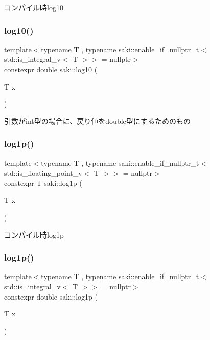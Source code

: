 コンパイル時log10 

\mbox{\label{namespacesaki_a7e5fde452567de6eaae1d5c481497757}} 
\subsubsection{\texorpdfstring{log10()}{log10()}\hspace{0.1cm}{\footnotesize\ttfamily [2/2]}}
{\footnotesize\ttfamily template$<$typename T , typename saki\+::enable\+\_\+if\+\_\+nullptr\+\_\+t$<$ std\+::is\+\_\+integral\+\_\+v$<$ T $>$$>$  = nullptr$>$ \\
constexpr double saki\+::log10 (\begin{DoxyParamCaption}\item[{T}]{x }\end{DoxyParamCaption})}



引数がint型の場合に、戻り値をdouble型にするためのもの 

\mbox{\label{namespacesaki_ae0b2550b674acc69fa1fbe407917fdc7}} 
\subsubsection{\texorpdfstring{log1p()}{log1p()}\hspace{0.1cm}{\footnotesize\ttfamily [1/2]}}
{\footnotesize\ttfamily template$<$typename T , typename saki\+::enable\+\_\+if\+\_\+nullptr\+\_\+t$<$ std\+::is\+\_\+floating\+\_\+point\+\_\+v$<$ T $>$$>$  = nullptr$>$ \\
constexpr T saki\+::log1p (\begin{DoxyParamCaption}\item[{T}]{x }\end{DoxyParamCaption})}



コンパイル時log1p 

\mbox{\label{namespacesaki_aec755aa143bd9a0d03c5ebb2dc5dd3de}} 
\subsubsection{\texorpdfstring{log1p()}{log1p()}\hspace{0.1cm}{\footnotesize\ttfamily [2/2]}}
{\footnotesize\ttfamily template$<$typename T , typename saki\+::enable\+\_\+if\+\_\+nullptr\+\_\+t$<$ std\+::is\+\_\+integral\+\_\+v$<$ T $>$$>$  = nullptr$>$ \\
constexpr double saki\+::log1p (\begin{DoxyParamCaption}\item[{T}]{x }\end{DoxyParamCaption})}




